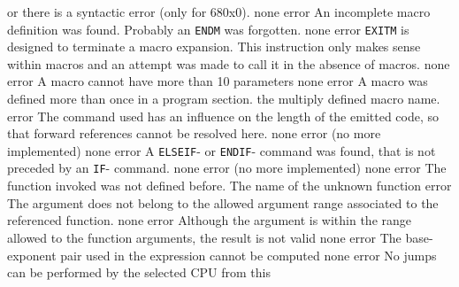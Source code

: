 \documentclass[12pt,twoside]{report}
\newcommand{\tty}[1]{{\tt #1}}
\begin{document}
\begin{description}
{                or there is a syntactic error (only for 680x0).}
               {none}
               {error}
               {An incomplete macro definition was found. Probably an
                \tty{ENDM} was forgotten.}
               {none}
               {error}
               {\tty{EXITM} is designed to terminate a macro expansion.  This
                instruction only makes sense within macros and an attempt
                was made to call it in the absence of macros.}
               {none}
               {error}
               {A macro cannot have more than 10 parameters}
               {none}
               {error}
               {A macro was defined more than once in a program section.}
               {the multiply defined macro name.}
               {error}
               {The command used has an influence on the length of the
                emitted code, so that forward references cannot be resolved
                here.}
               {none}
               {error}
               {(no more implemented)}
               {none}
               {error}
               {A \tty{ELSEIF}- or \tty{ENDIF}- command was found, that is not preceded
                by an \tty{IF}- command.}
               {none}
               {error}
               {(no more implemented)}
               {none}
               {error}
               {The function invoked was not defined before.}
               {The name of the unknown function}
               {error}
               {The argument does not belong to the allowed argument range
                associated to the referenced function.}
               {none}
               {error}
               {Although the argument is within the range allowed to the
                function arguments, the result is not valid}
               {none}
               {error}
               {The base-exponent pair used in the expression cannot be
                computed}
               {none}
               {error}
               {No jumps can be performed by the selected CPU from this
}
\end{description}
\end{document}
